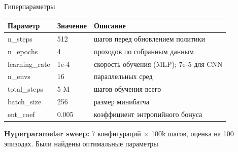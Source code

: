 \documentclass[aspectratio=169]{beamer}
\begin{document}
	\begin{frame}{Гиперпараметры}
		\begin{center}
			\begin{tabular}{@{}lll@{}}
				\toprule
				\rowcolor{ThemeGridStroke}
				\color{ThemeCellFilled}Параметр & \color{ThemeCellFilled}Значение & \color{ThemeCellFilled}Описание \\
				\midrule
				n\_steps        & 512   & шагов перед обновлением политики \\
				n\_epochs       & 4     & проходов по собранным данным \\
				learning\_rate  & 1e-4  & скорость обучения (MLP); 7e-5 для CNN \\
				n\_envs         & 16    & параллельных сред \\
				total\_steps    & 5 M   & шагов обучения всего \\
				batch\_size     & 256   & размер минибатча \\
				ent\_coef       & 0.005 & коэффициент энтропийного бонуса \\
				\bottomrule
			\end{tabular}
		\end{center}
		
		\bigskip
		\textbf{Hyperparameter sweep:} 7 конфигураций × 100k шагов, оценка на 100 эпизодах. Были найдены оптимальные параметры
	\end{frame}
	
\end{document}
